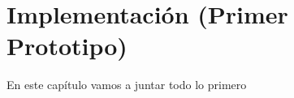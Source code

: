 \chapter{Implementación \newline (Primer Prototipo)}\label{ch:Implementación}
En este capítulo vamos a juntar todo lo primero
